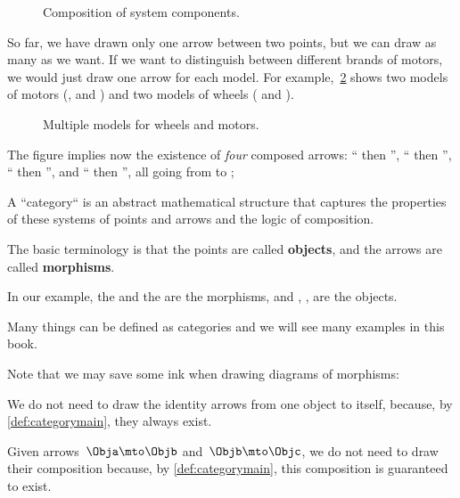 \begin{figure}[h!]
    \centering
    \caption{Composition of system components. }
    \label{fig:e4}
\end{figure}

So far, we have drawn only one arrow between two points, but we can draw as many as we want.
If we want to distinguish between different brands of motors, we would just draw
one arrow for each model.
For example,~\cref{fig:e4bis} shows two models of
motors (, and ) and two models of wheels
( and ).


\begin{figure}[h!]
    \centering
    \caption{Multiple models for wheels and motors.}
    \label{fig:e4bis}
\end{figure}

The figure implies now the existence of \emph{four} composed
arrows: `` then '',
`` then '',
`` then '', and
`` then '', all going from \translationalmotion to \electricpower;


A ``category`` is an abstract mathematical structure that captures the properties
of these systems of points and arrows and the logic of composition.

The basic terminology is that the points are called \textbf{objects},
and the arrows are called \textbf{morphisms}.

In our example, the \motor and the \wheels are the morphisms, and \electricpower, \rotationalmotion,
\translationalmotion are the objects.

Many things can be defined as categories and we will see many examples in this book.


Note that we may save some ink when drawing diagrams of morphisms:
\begin{compactitem}
    \item We do not need to draw the identity arrows from one object to itself, because, by \cref{def:categorymain}, they always exist.
    \item  Given arrows~$\Obja \mto \Objb$ and~$\Objb \mto \Objc$, we do not need to draw their composition because, by \cref{def:categorymain}, this composition is guaranteed to exist.
\end{compactitem}

